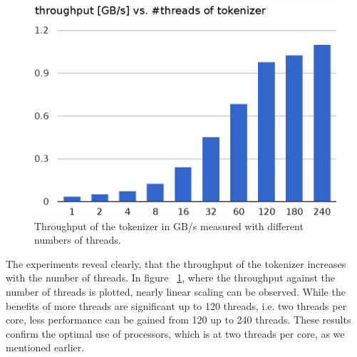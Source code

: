 \begin{figure}[h]\centering
  \includegraphics[scale=.66]{img/tokenizer_throughput_2.eps}
  \caption{Throughput of the tokenizer in GB/s measured with different numbers of threads.
  \label{tokenizer_throughput}}
\end{figure}
The experiments reveal clearly, that the throughput of the tokenizer increases with the number of threads. In figure ~\ref{tokenizer_throughput}, where the throughput against the number of threads is plotted, nearly linear scaling can be observed. While the benefits of more threads are significant up to 120 threads, i.e. two threads per core, less performance can be gained from 120 up to 240 threads. These results confirm the optimal use of processors, which is at two threads per core, as we mentioned earlier.

